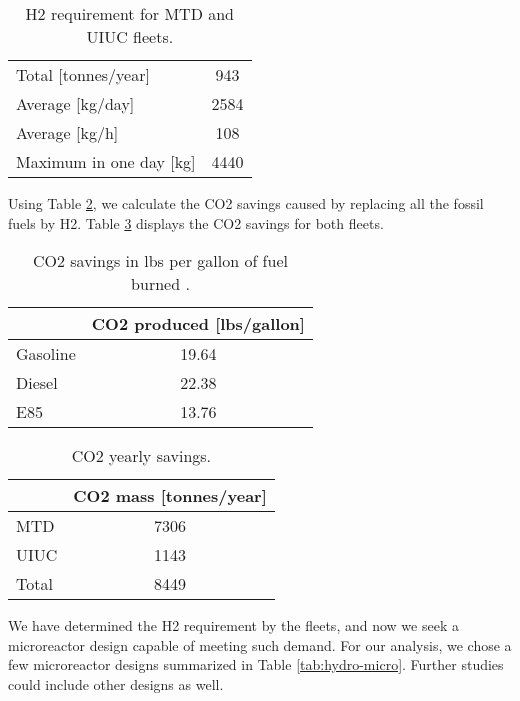\documentclass[11pt,letterpaper]{article}
\begin{document}
	\begin{table}[htbp!]
		\centering
	    \caption{\gls{H2} requirement for MTD and UIUC fleets.}
		\begin{tabular}{l|c}
		\hline
		Total [tonnes/year]     & 943    \\
		Average [kg/day] 	    & 2584   \\
		Average [kg/h] 		    & 108    \\
		Maximum in one day [kg] & 4440   \\ \hline
        \end{tabular}
        \label{tab:hydro-fleet}
	\end{table}

Using Table \ref{tab:co2-eq}, we calculate the \gls{CO2} savings caused by replacing all the fossil fuels by \gls{H2}.
Table \ref{tab:co2} displays the \gls{CO2} savings for both fleets.

	\begin{table}[htbp!]
		\centering
	    \caption{\gls{CO2} savings in lbs per gallon of fuel burned \cite{energy_information_administration_how_2014}.}
		\begin{tabular}{l|c}
		\hline
		              & \gls{CO2} produced [lbs/gallon] \\ \hline
		Gasoline      & 19.64           \\
		Diesel        & 22.38           \\
		E85           & 13.76           \\ \hline
        \end{tabular}
        \label{tab:co2-eq}
	\end{table}

	\begin{table}[htbp!]
		\centering
	    \caption{\gls{CO2} yearly savings.}
		\begin{tabular}{l|c}
		\hline
		            & \gls{CO2} mass [tonnes/year] \\ \hline
		MTD      	  & 7306           \\
		UIUC        & 1143           \\
		Total       & 8449           \\ \hline
        \end{tabular}
        \label{tab:co2}
	\end{table}

We have determined the \gls{H2} requirement by the fleets, and now we seek a microreactor design capable of meeting such demand.
For our analysis, we chose a few microreactor designs summarized in Table \ref{tab:hydro-micro}.
Further studies could include other designs as well.
\end{document}

